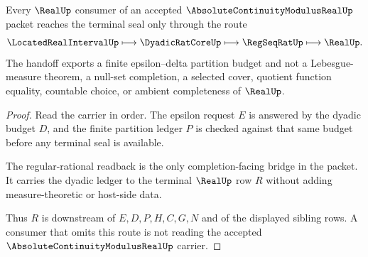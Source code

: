 \begin{theorem}
\label{thm:absolute-continuity-modulus-real-realup-handoff}
Every $\RealUp$ consumer of an accepted $\AbsoluteContinuityModulusRealUp$ packet reaches the terminal seal only through the route
$$
\LocatedRealIntervalUp \longmapsto \DyadicRatCoreUp \longmapsto \RegSeqRatUp \longmapsto \RealUp .
$$
The handoff exports a finite epsilon--delta partition budget and not a Lebesgue-measure theorem, a null-set completion, a selected cover, quotient function equality, countable choice, or ambient completeness of $\RealUp$.
\end{theorem}
\begin{proof}
Read the carrier in order. The epsilon request $E$ is answered by the dyadic budget $D$, and the finite partition ledger $P$ is checked against that same budget before any terminal seal is available.

The regular-rational readback is the only completion-facing bridge in the packet. It carries the dyadic ledger to the terminal $\RealUp$ row $R$ without adding measure-theoretic or host-side data.

Thus $R$ is downstream of $E,D,P,H,C,G,N$ and of the displayed sibling rows. A consumer that omits this route is not reading the accepted $\AbsoluteContinuityModulusRealUp$ carrier.
\end{proof}




